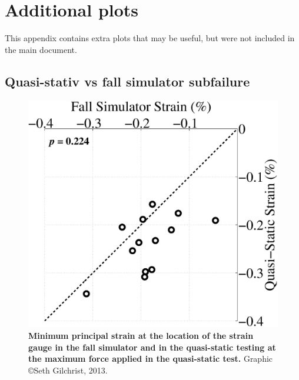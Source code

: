 \chapter{Additional plots}
\label{ch:additional_plots}
This appendix contains extra plots that may be useful, but were not included in the main document.
\clearpage

\section{Quasi-stativ \acs*{vs} fall simulator subfailure}
\label{sec:additional_QS_FS}

\begin{figure}[h]
\centering
\includegraphics[width=\linewidth]{./appendixPlots/figures/StrainVsStrain}
\caption[Quasi-static vs.\ fall simulator strain]{\textbf{Minimum principal strain at the location of the strain gauge in the fall simulator and in the quasi-static testing at the maximum force applied in the quasi-static test.} Graphic \copyright Seth Gilchrist, 2013.}
\label{fig:StrainVsStrain}
\end{figure}
\clearpage

